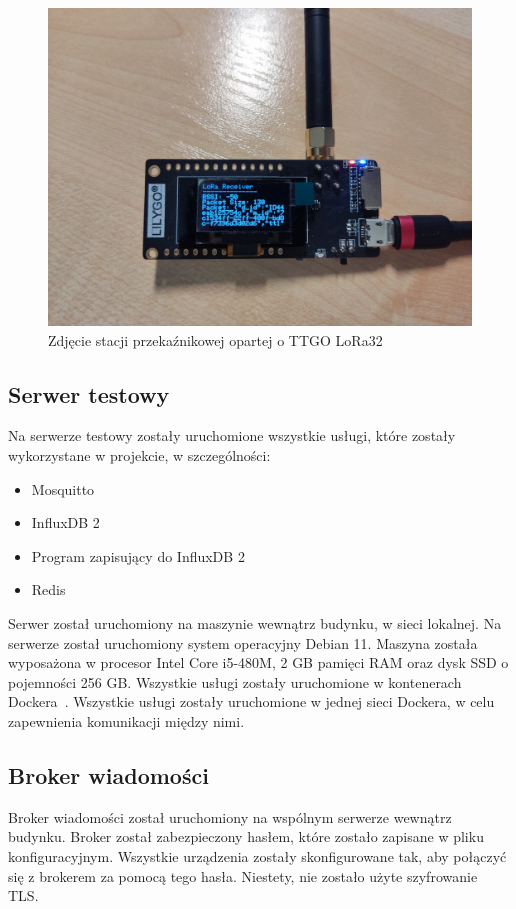 \begin{figure}[b!]
    \begin{center}
        \includegraphics[width=13cm]{pic/stacja1.jpg}
    \end{center}
    \caption{Zdjęcie stacji przekaźnikowej opartej o TTGO LoRa32}\label{rys:stacja1}
\end{figure}


\subsection{Serwer testowy}
Na serwerze testowy zostały uruchomione wszystkie usługi, które zostały wykorzystane w projekcie, w szczególności:
\begin{itemize}
    \item Mosquitto
    \item InfluxDB 2
    \item Program zapisujący do InfluxDB 2
    \item Redis
\end{itemize}
Serwer został uruchomiony na maszynie wewnątrz budynku, w sieci lokalnej. Na serwerze został uruchomiony system operacyjny Debian 11. Maszyna została wyposażona w procesor Intel Core i5-480M, 2 GB pamięci RAM oraz dysk SSD o pojemności 256 GB. Wszystkie usługi zostały uruchomione w kontenerach Dockera~\cite{tools:docker}. Wszystkie usługi zostały uruchomione w jednej sieci Dockera, w celu zapewnienia komunikacji między nimi.

\subsection{Broker wiadomości}
Broker wiadomości został uruchomiony na wspólnym serwerze wewnątrz budynku. Broker został zabezpieczony hasłem, które zostało zapisane w pliku konfiguracyjnym. Wszystkie urządzenia zostały skonfigurowane tak, aby połączyć się z brokerem za pomocą tego hasła. Niestety, nie zostało użyte szyfrowanie TLS.

